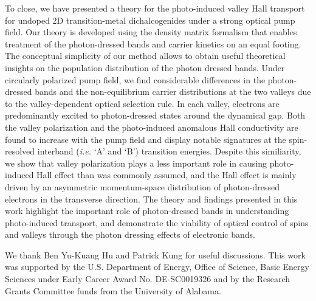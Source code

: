 \documentclass[reprint,amsmath,amssymb,aps,prb]{revtex4-1}
\begin{document}
To close, we have presented a theory for the photo-induced valley Hall transport for undoped 2D transition-metal dichalcogenides under a strong optical pump field. Our theory is developed using the density matrix formalism that enables treatment of the photon-dressed bands and carrier kinetics on an equal footing. The conceptual simplicity of our method allows to obtain useful theoretical insights on the population distribution of the photon dressed bands. Under circularly polarized pump field, we find considerable differences in the photon-dressed bands and the non-equilibrium carrier distributions at the two  valleys due to the valley-dependent optical selection rule. In each valley, electrons are predominantly excited to photon-dressed states  around the dynamical gap. Both the valley polarization and the photo-induced anomalous Hall conductivity are found to increase with the pump field and display notable signatures at the spin-resolved interband (\textit{i.e.} `A' and `B') transition energies. Despite this similiarity, we show that valley polarization plays a less important role in causing photo-induced Hall effect than was commonly assumed,
and the Hall effect is mainly driven by an asymmetric momentum-space distribution of photon-dressed electrons in the transverse direction. The theory and findings presented in this work highlight the important role of photon-dressed bands in understanding photo-induced transport, and demonstrate the viability of optical control of spins and valleys through the photon dressing effects of electronic bands.

\begin{acknowledgments}
We thank Ben Yu-Kuang Hu and Patrick Kung for useful discussions. This work was supported by the U.S. Department of Energy, Office of Science, Basic Energy Sciences under Early Career Award No.  DE-SC0019326 and by the Research Grants Committee funds from the University of Alabama. 
\end{acknowledgments}
\end{document}
